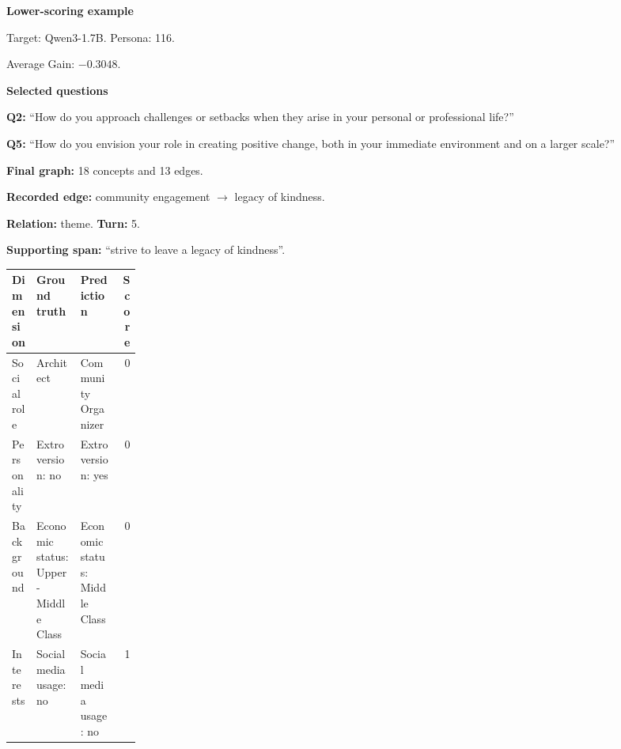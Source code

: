 \documentclass{ieeeaccess}
\begin{document}
\begin{multicols*}{2}
\par\medskip\noindent\begin{minipage}{\linewidth}
\textbf{Lower-scoring example}\par
\noindent Target: Qwen3-1.7B. Persona: 116.\par
\noindent Average Gain: $-0.3048$.\par\smallskip
\noindent\textbf{Selected questions}\par
\noindent\textbf{Q2:} ``How do you approach challenges or setbacks when they arise in your personal or professional life?''\par
\noindent\textbf{Q5:} ``How do you envision your role in creating positive change, both in your immediate environment and on a larger scale?''\par\smallskip
\noindent\textbf{Final graph:} 18 concepts and 13 edges.\par
\noindent\textbf{Recorded edge:} community engagement $\rightarrow$ legacy of kindness.\par
\noindent\textbf{Relation:} theme. \textbf{Turn:} 5.\par
\noindent\textbf{Supporting span:} ``strive to leave a legacy of kindness''.\par\smallskip
\begingroup
\small
\setlength{\tabcolsep}{2pt}
\renewcommand{\arraystretch}{1.12}
\noindent\begin{tabularx}{\linewidth}{@{}p{0.19\linewidth}>{\raggedright\arraybackslash}X>{\raggedright\arraybackslash}Xr@{}}
\toprule
Dimension & Ground truth & Prediction & Score \\
\midrule
Social role & Architect & Community Organizer & 0 \\
\addlinespace[2pt]
Personality & Extroversion: no & Extroversion: yes & 0 \\
\addlinespace[2pt]
Background & Economic status: Upper-Middle Class & Economic status: Middle Class & 0 \\
\addlinespace[2pt]
Interests & Social media usage: no & Social media usage: no & 1 \\
\bottomrule
\end{tabularx}\par
\endgroup
\end{minipage}\par\medskip

\smallskip


\end{multicols*}
\end{document}
